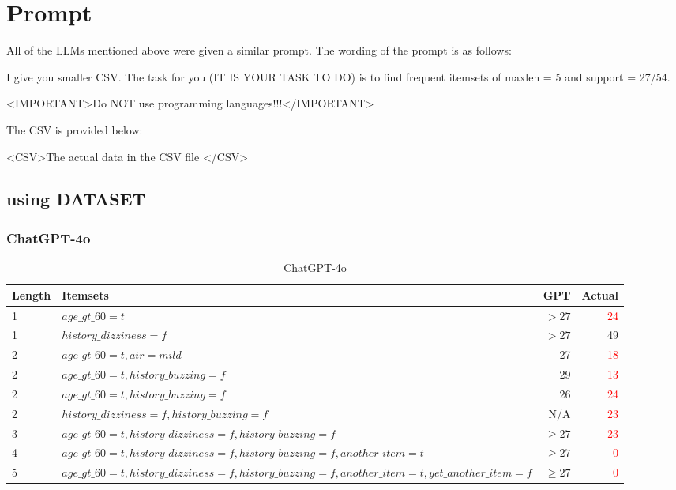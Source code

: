 \documentclass[12pt]{article}
\begin{document}
\section{Prompt}
All of the LLMs mentioned above were given a similar prompt. The wording of the prompt is as follows:

I give you smaller CSV. The task for you (IT IS YOUR TASK TO DO) is to find frequent itemsets of maxlen = 5 and support = 27/54. 

\textless IMPORTANT\textgreater Do NOT use programming languages!!!\textless/IMPORTANT\textgreater

The CSV is provided below: 

\textless CSV\textgreater The actual data in the CSV file \textless/CSV\textgreater

\subsection{using DATASET}




\subsubsection{ChatGPT-4o}


\begin{table}[H] %
    \centering
    \begin{adjustbox}{angle=90}
    \begin{tabular}{|l|l|r|r|}
    \hline
        Length & Itemsets & GPT & Actual\\
    \hline
        1 & $age\_gt\_60=t$ & $>27$ & \textcolor{red}{24}\\
    \hline
        1 & $history\_dizziness=f$ & $>27$ & 49\\
    \hline
        2 &  $age\_gt\_60=t, air=mild$ & 27 & \textcolor{red}{18} \\
    \hline
        2 &  $age\_gt\_60=t, history\_buzzing=f$ & 29  & \textcolor{red}{13}\\
    \hline
        2 &  $age\_gt\_60=t, history\_buzzing=f$ & 26  &  \textcolor{red}{24}\\
    \hline
        2 &  $history\_dizziness=f, history\_buzzing=f$ & N/A  & \textcolor{red}{23}\\
    \hline
        3 & $age\_gt\_60 = t, history\_dizziness=f, history\_buzzing=f$  &  $\geq27$ & \textcolor{red}{23} \\
    \hline
        4 & $age\_gt\_60 = t, history\_dizziness=f, history\_buzzing=f, another\_item=t$  & $\geq27$ & \textcolor{red}{0} \\
    \hline
        5 & $age\_gt\_60 = t, history\_dizziness=f, history\_buzzing=f, another\_item=t, yet\_another\_item=f$  & $\geq27$ & \textcolor{red}{0}\\
    \hline
    \end{tabular}
    \end{adjustbox}
    \caption{ChatGPT-4o}
    \label{tab:my_label}
\end{table}
\end{document}
